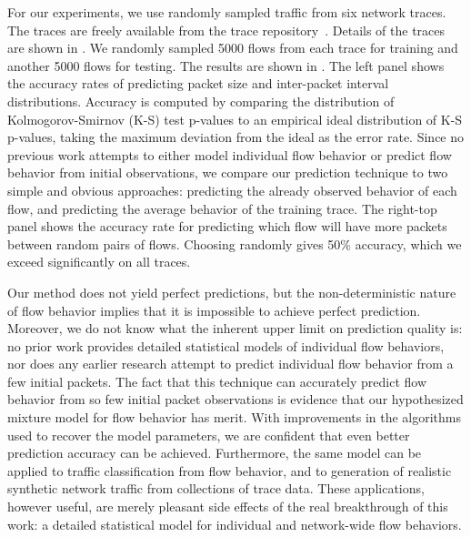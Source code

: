 \documentclass{acm_proc_article-sp}
\begin{document}
For our experiments, we use randomly sampled traffic from six network traces.
The traces are freely available from the  trace repository~\cite{Yeo06}.
Details of the traces are shown in .
We randomly sampled 5000 flows from each trace for training and another 5000 flows for testing.
The results are shown in .
The left panel shows the accuracy rates of predicting packet size and inter-packet interval distributions.
Accuracy is computed by comparing the distribution of Kolmogorov-Smirnov (K-S) test p-values to an empirical ideal distribution of K-S p-values, taking the maximum deviation from the ideal as the error rate.
Since no previous work attempts to either model individual flow behavior or predict flow behavior from initial observations, we compare our prediction technique to two simple and obvious approaches:
predicting the already observed behavior of each flow, and
predicting the average behavior of the training trace.
The right-top panel shows the accuracy rate for predicting which flow will have more packets between random pairs of flows.
Choosing randomly gives 50\% accuracy, which we exceed significantly on all traces.

Our method does not yield perfect predictions, but the non-deterministic nature of flow behavior implies that it is impossible to achieve perfect prediction.
Moreover, we do not know what the inherent upper limit on prediction quality is:
no prior work provides detailed statistical models of individual flow behaviors, nor does any earlier research attempt to predict individual flow behavior from a few initial packets.
The fact that this technique can accurately predict flow behavior from so few initial packet observations is evidence that our hypothesized mixture model for flow behavior has merit.
With improvements in the algorithms used to recover the model parameters, we are confident that even better prediction accuracy can be achieved.
Furthermore, the same model can be applied to traffic classification from flow behavior, and to generation of realistic synthetic network traffic from collections of trace data.
These applications, however useful, are merely pleasant side effects of the real breakthrough of this work:
a detailed statistical model for individual and network-wide flow behaviors.

\scriptsize


\end{document}
